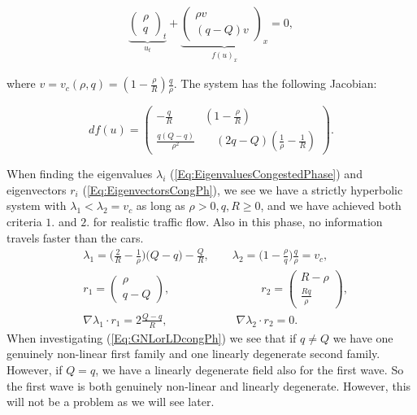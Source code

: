 \documentclass[10pt]{article}
\numberwithin{equation}{section}
\begin{document}
\begin{align*}
    \underbrace{\begin{pmatrix} \rho \\ q \end{pmatrix}_t}_{u_t} +  \underbrace{\begin{pmatrix} \rho v  \\ (q - Q) v \end{pmatrix}_x}_{f(u)_x} = 0, 
\end{align*}

where $v = v_c(\rho,  q) = (1 - \frac{\rho}{R}) \frac{q}{\rho}$. The system has the following Jacobian:

\begin{equation*}
    df(u) =\begin{pmatrix} -\frac{q}{R} & (1- \frac{\rho}{R}) \\ 
                            \frac{q(Q-q)}{\rho ^2} & \quad (2q -Q)(\frac{1}{\rho} - \frac{1}{R}) \end{pmatrix}.
\end{equation*}

When finding the eigenvalues $\lambda_i$ (\ref{Eq:EigenvaluesCongestedPhase}) and eigenvectors $r_i$ (\ref{Eq:EigenvectorsCongPh}), we see we have a strictly hyperbolic system with $\lambda_1 < \lambda_2 = v_c$ as long as $\rho > 0, q, R \geq 0$, and we have achieved both criteria $1. $ and $2.$ for realistic traffic flow.  Also in this phase, no information travels faster than the cars. 
\begin{align}
    &\lambda_1 = \big ( \frac{2}{R} - \frac{1}{\rho} )\big (Q- q) - \frac{Q}{R} , \quad \quad \lambda_2 = \big(1 - \frac{\rho}{q}\big)\frac{q}{\rho} = v_c , \label{Eq:EigenvaluesCongestedPhase} \\
    & r_1 = \begin{pmatrix} \rho \\ q - Q \end{pmatrix}, \quad \quad \quad  \quad \quad \quad \quad \quad  r_2 = \begin{pmatrix} R - \rho \\ \frac{Rq}{\rho} \end{pmatrix} , \label{Eq:EigenvectorsCongPh} \\
    & \nabla \lambda_1 \cdot r_1 = 2\frac{Q-q}{R}, \quad \quad \quad \quad \quad  \quad \nabla \lambda_2 \cdot r_2 = 0 . \label{Eq:GNLorLDcongPh}
\end{align}
When investigating (\ref{Eq:GNLorLDcongPh}) we see that if $q \neq Q$ we have one genuinely non-linear first family and one linearly degenerate second family. However, if $ Q = q$, we have a linearly degenerate field also for the first wave. So the first wave is both genuinely non-linear and linearly degenerate. However, this will not be a problem as we will see later.
\end{document}
